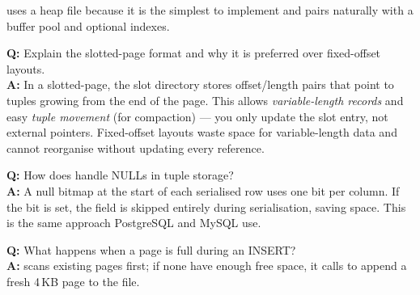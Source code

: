 \shiftdb{} uses a heap file because it is the simplest to implement and pairs naturally with a buffer pool and optional indexes.

\begin{interviewbox}
\textbf{Q:} Explain the slotted-page format and why it is preferred over fixed-offset layouts.\\[4pt]
\textbf{A:} In a slotted-page, the slot directory stores offset/length pairs that point to tuples growing from the end of the page.  This allows \emph{variable-length records} and easy \emph{tuple movement} (for compaction) --- you only update the slot entry, not external pointers.  Fixed-offset layouts waste space for variable-length data and cannot reorganise without updating every reference.

\vspace{6pt}
\textbf{Q:} How does \shiftdb{} handle NULLs in tuple storage?\\[4pt]
\textbf{A:} A null bitmap at the start of each serialised row uses one bit per column.  If the bit is set, the field is skipped entirely during serialisation, saving space.  This is the same approach PostgreSQL and MySQL use.

\vspace{6pt}
\textbf{Q:} What happens when a page is full during an INSERT?\\[4pt]
\textbf{A:}  scans existing pages first; if none have enough free space, it calls  to append a fresh 4\,KB page to the file.
\end{interviewbox}

